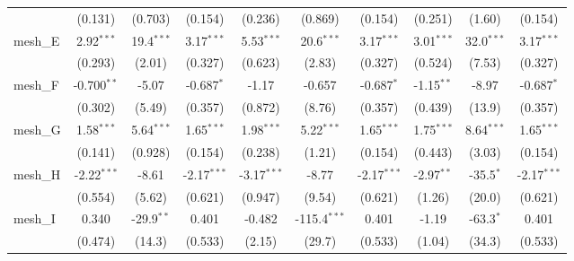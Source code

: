 \begin{tabular}{lccccccccc}
                                                               & (0.131)        & (0.703)        & (0.154)       & (0.236)       & (0.869)        & (0.154)       & (0.251)       & (1.60)        & (0.154)\\   
   mesh\_E                                                     & 2.92$^{***}$   & 19.4$^{***}$   & 3.17$^{***}$  & 5.53$^{***}$  & 20.6$^{***}$   & 3.17$^{***}$  & 3.01$^{***}$  & 32.0$^{***}$  & 3.17$^{***}$\\   
                                                               & (0.293)        & (2.01)         & (0.327)       & (0.623)       & (2.83)         & (0.327)       & (0.524)       & (7.53)        & (0.327)\\   
   mesh\_F                                                     & -0.700$^{**}$  & -5.07          & -0.687$^{*}$  & -1.17         & -0.657         & -0.687$^{*}$  & -1.15$^{**}$  & -8.97         & -0.687$^{*}$\\   
                                                               & (0.302)        & (5.49)         & (0.357)       & (0.872)       & (8.76)         & (0.357)       & (0.439)       & (13.9)        & (0.357)\\   
   mesh\_G                                                     & 1.58$^{***}$   & 5.64$^{***}$   & 1.65$^{***}$  & 1.98$^{***}$  & 5.22$^{***}$   & 1.65$^{***}$  & 1.75$^{***}$  & 8.64$^{***}$  & 1.65$^{***}$\\   
                                                               & (0.141)        & (0.928)        & (0.154)       & (0.238)       & (1.21)         & (0.154)       & (0.443)       & (3.03)        & (0.154)\\   
   mesh\_H                                                     & -2.22$^{***}$  & -8.61          & -2.17$^{***}$ & -3.17$^{***}$ & -8.77          & -2.17$^{***}$ & -2.97$^{**}$  & -35.5$^{*}$   & -2.17$^{***}$\\   
                                                               & (0.554)        & (5.62)         & (0.621)       & (0.947)       & (9.54)         & (0.621)       & (1.26)        & (20.0)        & (0.621)\\   
   mesh\_I                                                     & 0.340          & -29.9$^{**}$   & 0.401         & -0.482        & -115.4$^{***}$ & 0.401         & -1.19         & -63.3$^{*}$   & 0.401\\   
                                                               & (0.474)        & (14.3)         & (0.533)       & (2.15)        & (29.7)         & (0.533)       & (1.04)        & (34.3)        & (0.533)\\   

\end{tabular}
